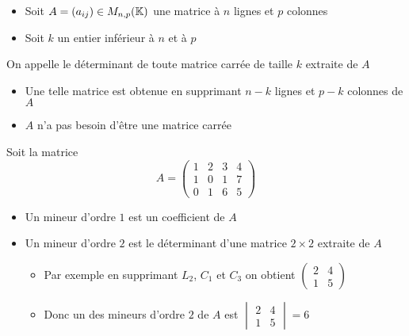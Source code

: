 \begin{frame}
\begin{itemize}
  \item  Soit $A=(a_{ij}) \in M_{n,p}(\mathbb{K})$ une matrice à $n$ lignes 
et $p$ colonnes
\item\pause Soit $k$ un entier inférieur à $n$ et à $p$
\end{itemize}

\pause
\begin{mydefinition}
On appelle  le déterminant de toute matrice carrée de taille $k$ extraite  de $A$
\end{mydefinition}

\begin{itemize}
  \item\pause Une telle matrice est obtenue en supprimant $n-k$ lignes et $p-k$ colonnes de $A$
  \item\pause $A$ n'a pas besoin d'être une matrice carrée
\end{itemize}

\end{frame}


\begin{frame}
\begin{exemple}
Soit la matrice 
$$A = 
\begin{pmatrix}
1&2&3&4\\
1&0&1&7\\
0&1&6&5
\end{pmatrix}$$

\begin{itemize}
  \item\pause Un mineur d'ordre $1$ est un coefficient de $A$
    \item\pause Un mineur d'ordre $2$ est le déterminant d'une matrice $2\times 2$ extraite de $A$
\begin{itemize}
  \item\pause  Par exemple en supprimant $L_2$, $C_1$ et $C_3$ \pause on obtient $\begin{pmatrix}2&4\\1&5\end{pmatrix}$
  \item\pause Donc un des mineurs d'ordre $2$ de $A$ est $\begin{vmatrix}2&4\\1&5\end{vmatrix} = 6$
\end{itemize} 
\end{itemize}
\end{exemple}
\end{frame}

